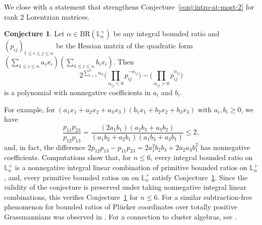 \documentclass{amsart}
\theoremstyle{definition}
\newtheorem{conjecture}[theorem]{Conjecture}
\newtheorem{lemma}[theorem]{Lemma}
\theoremstyle{remark}
\newtheorem{remark}[theorem]{Remark}
\newtheorem{example}[theorem]{Example}
\def\L{\mathbb{L}}
\def\BR{\mathrm{BR}}
\begin{document}
We close with a statement that strengthens Conjecture~\ref{conj:intro-at-most-2} for rank $2$ Lorentzian matrices.

\begin{conjecture}\label{conj:sub-free}
Let $\alpha \in \BR(\L_n^+)$ be any integral bounded ratio and $(p_{ij})_{1\le i\le j\le n}$ be the Hessian matrix of the quadratic form $\left(\sum_{1\leq i\leq n}a_ix_i\right)\left(\sum_{1\leq i\leq n}b_ix_i\right)$. Then %
\[
2^{\sum_{i=1}^n\alpha_{ii}}\Biggl(\prod_{\alpha_{ij}<0}p_{ij}^{-\alpha_{ij}}\Biggr)-\Biggl(\prod_{\alpha_{ij}>0}p_{ij}^{\alpha_{ij}}\Biggr)\]
	is a polynomial with nonnegative coefficients in $a_i$ and $b_i$. 
\end{conjecture}

For example, for $(a_1x_1+a_2x_2+a_3x_3)(b_1x_1+b_2x_2+b_3x_3)$ with $a_i,b_i \ge 0$, we have 
\[
\frac{p_{11}p_{23}}{p_{12}p_{13}}=\frac{(2a_1b_1)(a_2b_3+a_3b_2)}{(a_1b_2+a_2b_1)(a_1b_3+a_3b_1)} \le 2,
\]
and, in fact, the difference $2p_{12}p_{13}-p_{11}p_{23}=2a^2_1b_2b_3+2a_2a_3b_1^2$
has nonnegative coefficients.
Computations show that, for $n \le 6$, every integral bounded ratio on $\L_n^+$ is a nonnegative integral linear combination of primitive bounded ratios on $\L_n^+$, and, every primitive bounded ratios on on $\L_n^+$ satisfy Conjecture~\ref{conj:sub-free}. Since the validity of the conjecture is preserved under taking nonnegative integral linear combinations, this verifies Conjecture~\ref{conj:sub-free} for $n \le 6$.
For a similar subtraction-free phenomenon for bounded ratios of Pl\"ucker coordinates over totally positive Grassmannians was observed in \cite[Conjecture 37]{BoFr}. For a connection to cluster algebras,  see \cite{Gekhtman-Greenberg-Soskin}.   
\end{document}
